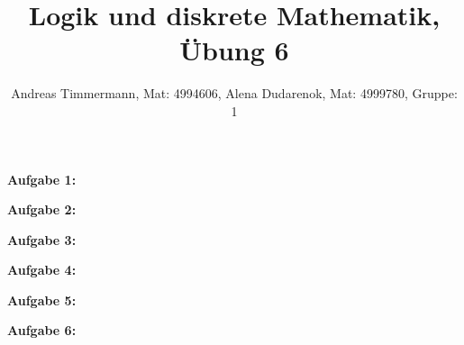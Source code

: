 \documentclass[a4paper]{scrartcl}
\title{Logik und diskrete Mathematik, Übung 6}
\author{Andreas Timmermann, Mat: 4994606, Alena Dudarenok, Mat: 4999780, Gruppe: 1}
\begin{document}
	\maketitle
	\begin{flushleft}
		\textbf{Aufgabe 1:}\\
	\end{flushleft}
	\begin{flushleft}
		\textbf{Aufgabe 2:}\\
	\end{flushleft}
	\begin{flushleft}
		\textbf{Aufgabe 3:}\\		
	\end{flushleft}
	\begin{flushleft}
		\textbf{Aufgabe 4:}\\
	\end{flushleft}
	\begin{flushleft}
		\textbf{Aufgabe 5:}\\		
	\end{flushleft}
	\begin{flushleft}
		\textbf{Aufgabe 6:}\\		
	\end{flushleft}
\end{document}
